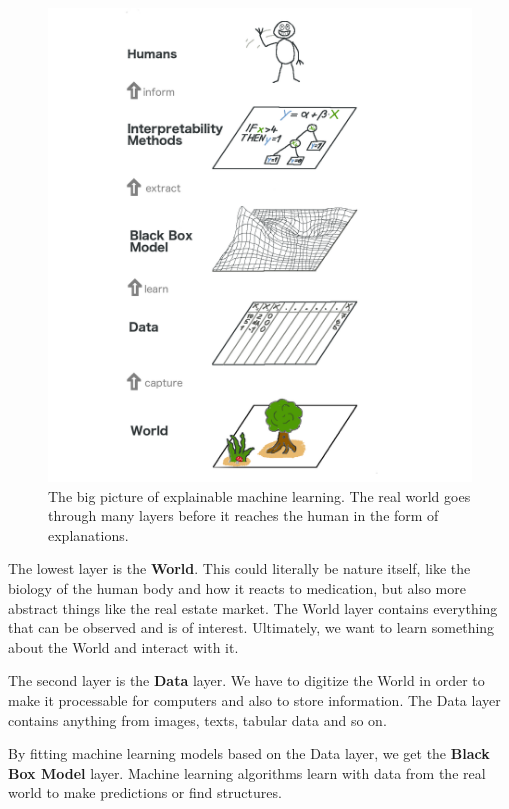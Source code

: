 \documentclass[
  12pt,
]{krantz}
\begin{document}
\begin{figure}

{\centering \includegraphics[width=\textwidth]{images/big-picture} 

}

\caption{The big picture of explainable machine learning. The real world goes through many layers before it reaches the human in the form of explanations.}\label{fig:bigpicture}
\end{figure}

The lowest layer is the \textbf{World}.
This could literally be nature itself, like the biology of the human body and how it reacts to medication, but also more abstract things like the real estate market.
The World layer contains everything that can be observed and is of interest.
Ultimately, we want to learn something about the World and interact with it.

The second layer is the \textbf{Data} layer.
We have to digitize the World in order to make it processable for computers and also to store information.
The Data layer contains anything from images, texts, tabular data and so on.

By fitting machine learning models based on the Data layer, we get the \textbf{Black Box Model} layer.
Machine learning algorithms learn with data from the real world to make predictions or find structures.
\end{document}
